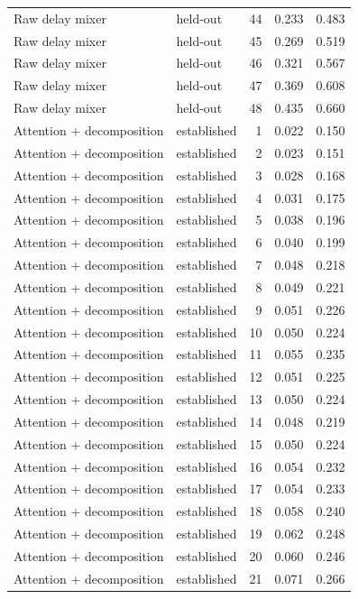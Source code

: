 \begin{tabular}{llrrr}
Raw delay mixer & held-out & 44 & 0.233 & 0.483 \\
Raw delay mixer & held-out & 45 & 0.269 & 0.519 \\
Raw delay mixer & held-out & 46 & 0.321 & 0.567 \\
Raw delay mixer & held-out & 47 & 0.369 & 0.608 \\
Raw delay mixer & held-out & 48 & 0.435 & 0.660 \\
Attention + decomposition & established & 1 & 0.022 & 0.150 \\
Attention + decomposition & established & 2 & 0.023 & 0.151 \\
Attention + decomposition & established & 3 & 0.028 & 0.168 \\
Attention + decomposition & established & 4 & 0.031 & 0.175 \\
Attention + decomposition & established & 5 & 0.038 & 0.196 \\
Attention + decomposition & established & 6 & 0.040 & 0.199 \\
Attention + decomposition & established & 7 & 0.048 & 0.218 \\
Attention + decomposition & established & 8 & 0.049 & 0.221 \\
Attention + decomposition & established & 9 & 0.051 & 0.226 \\
Attention + decomposition & established & 10 & 0.050 & 0.224 \\
Attention + decomposition & established & 11 & 0.055 & 0.235 \\
Attention + decomposition & established & 12 & 0.051 & 0.225 \\
Attention + decomposition & established & 13 & 0.050 & 0.224 \\
Attention + decomposition & established & 14 & 0.048 & 0.219 \\
Attention + decomposition & established & 15 & 0.050 & 0.224 \\
Attention + decomposition & established & 16 & 0.054 & 0.232 \\
Attention + decomposition & established & 17 & 0.054 & 0.233 \\
Attention + decomposition & established & 18 & 0.058 & 0.240 \\
Attention + decomposition & established & 19 & 0.062 & 0.248 \\
Attention + decomposition & established & 20 & 0.060 & 0.246 \\
Attention + decomposition & established & 21 & 0.071 & 0.266 \\

\end{tabular}
